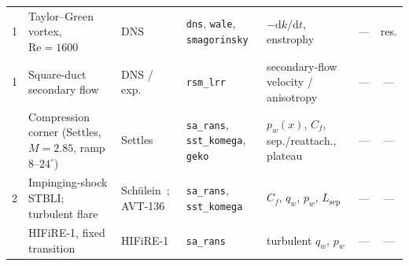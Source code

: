\documentclass[journal,biblatex]{new-aiaa}
\newcommand{\Field}[1]{\texttt{#1}}
\begin{document}
\begin{table}[H]
\begin{tabularx}{\linewidth}{@{}c >{\raggedright\arraybackslash}p{2.15cm} >{\raggedright\arraybackslash}p{1.75cm} >{\raggedright\arraybackslash}p{1.9cm} X c c@{}}
1 & Taylor--Green vortex, $\mathrm{Re}{=}1600$ & DNS~\cite{engelmann_direct_2023} & \Field{dns}, \Field{wale}, \Field{smagorinsky} & $-\mathrm{d}k/\mathrm{d}t$, enstrophy & --- & res. \\
1 & Square-duct secondary flow & DNS / exp. & \Field{rsm\_lrr} & secondary-flow velocity / anisotropy & --- & --- \\
\addlinespace
2 & Compression corner (Settles, $M{=}2.85$, ramp $8$--$24^\circ$) & Settles~\cite{settles_incipient_1976} & \Field{sa\_rans}, \Field{sst\_komega}, \Field{geko} & $p_w(x)$, $C_f$, sep./reattach., plateau & --- & --- \\
2 & Impinging-shock STBLI; turbulent flare & Sch\"ulein~\cite{schulein_skin_2006}; AVT-136~\cite{research_and_technology_organization_assessment_2011} & \Field{sa\_rans}, \Field{sst\_komega} & $C_f$, $q_w$, $p_w$, $L_{\mathrm{sep}}$ & --- & --- \\
\addlinespace
3 & HIFiRE-1, fixed transition & HIFiRE-1~\cite{wadhams_ground_2008,maclean_ground_2008} & \Field{sa\_rans} & turbulent $q_w$, $p_w$ & --- & --- \\
\bottomrule
\end{tabularx}
\end{table}
\end{document}
